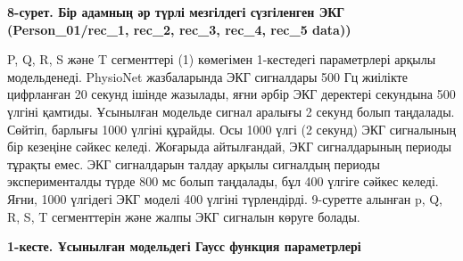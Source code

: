 {{\bfseries 8-сурет. Бір адамның әр түрлі мезгілдегі сүзгіленген ЭКГ
(Person\_01/rec\_1, rec\_2, rec\_3, rec\_4, rec\_5 data))}

P, Q, R, S және T сегменттері (1) көмегімен 1-кестедегі параметрлері
арқылы модельденеді. PhysioNet жазбаларында ЭКГ сигналдары 500 Гц
жиілікте цифрланған 20 секунд ішінде жазылады, яғни әрбір ЭКГ деректері
секундына 500 үлгіні қамтиды. Ұсынылған модельде сигнал аралығы 2 секунд
болып таңдалады. Сөйтіп, барлығы 1000 үлгіні құрайды. Осы 1000 үлгі (2
секунд) ЭКГ сигналының бір кезеңіне сәйкес келеді. Жоғарыда айтылғандай,
ЭКГ сигналдарының периоды тұрақты емес. ЭКГ сигналдарын талдау арқылы
сигналдың периоды эксперименталды түрде 800 мс болып таңдалады, бұл 400
үлгіге сәйкес келеді. Яғни, 1000 үлгідегі ЭКГ моделі 400 үлгіні
түрлендірді. 9-суретте алынған p, Q, R, S, T сегменттерін және жалпы ЭКГ
сигналын көруге болады.

{\bfseries 1-кесте. Ұсынылған модельдегі Гаусс функция параметрлері}


}

